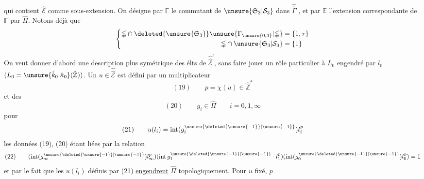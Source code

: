 qui contient $\hat{\mathcal E}$ comme sous-extension. On désigne par $\mathbb\Gamma$ le commutant de $\unsure{\mathfrak S_3|\mathcal S_3}$ dans $\widehat{\widehat\Gamma}$ , et par $\mathbb E$ l'extension correspondante de $\mathbb\Gamma$ par $\hat\Pi$. Notons déjà que
\[
\left\{\begin{aligned}
\mathbb\Gamma\cap\deleted{\unsure{\mathfrak S_3}}\unsure{\Gamma_{\unsure{0,3}}|\mathbb\Gamma}&=\{1,\tau\}\\
\mathbb\Gamma\cap\unsure{\mathfrak S_3|\mathcal S_3}&=\{1\}
\end{aligned}\right.
\]
On veut donner d'abord une description plus symétrique des élts de $\widehat{\widehat{\mathcal E}}^!$, sans faire jouer un rôle particulier à $L_0$ engendré par $l_0$ $(L_0=\unsure{\hat k_0|\hat\kappa_0}(\hat{\mathbb Z}))$. Un $u\in\widehat{\widehat{\mathcal E}}$ est  défini par un multiplicateur
\[
(19)\qquad p=\chi(u)\in\hat{\mathbb Z}^{*}
\]
et des
\[
(20)\qquad g_i\in\hat\Pi\qquad i=0,1,\infty
\]
pour
\[
(21)\qquad u(l_i)=\operatorname{int}(g_i^{\unsure{\deleted{\unsure{-1}}|\unsure{-1}}})l_i^p
\]
les données (19), (20) étant liées par la relation
\[
(22)\qquad(\operatorname{int}(g_\infty^{\unsure{\deleted{\unsure{-1}}|\unsure{-1}}})l_\infty^p)
(\operatorname{int}g_1^{\unsure{\deleted{\unsure{-1}}|\unsure{-1}}}\cdot l_1^p)
(\operatorname{int}(g_0^{\unsure{\deleted{\unsure{-1}}|\unsure{-1}}})l_0^p)=1
\]
et par le fait que les $u(l_i)$ définis par (21) \uline{engendrent} $\hat\Pi$ topologiquement. Pour $u$ fixé, $p$
